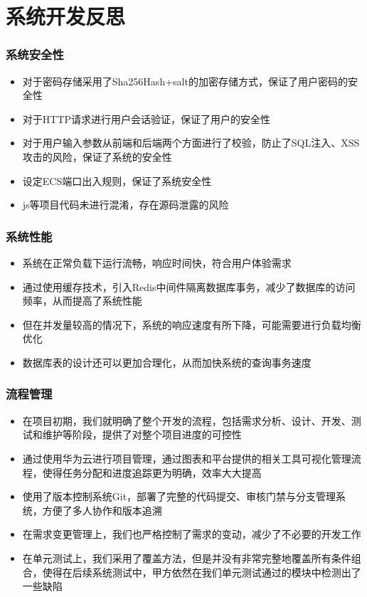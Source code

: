 \section{系统开发反思}
\begin{frame}
    \frametitle{系统安全性}
    \begin{itemize}
        \item 对于密码存储采用了Sha256Hash+salt的加密存储方式，保证了用户密码的安全性
        \item 对于HTTP请求进行用户会话验证，保证了用户的安全性
        \item 对于用户输入参数从前端和后端两个方面进行了校验，防止了SQL注入、XSS攻击的风险，保证了系统的安全性
        \item 设定ECS端口出入规则，保证了系统安全性
        \item js等项目代码未进行混淆，存在源码泄露的风险
    \end{itemize}
\end{frame}

\begin{frame}
    \frametitle{系统性能}
    \begin{itemize}
        \item 系统在正常负载下运行流畅，响应时间快，符合用户体验需求
        \item 通过使用缓存技术，引入Redis中间件隔离数据库事务，减少了数据库的访问频率，从而提高了系统性能
        \item 但在并发量较高的情况下，系统的响应速度有所下降，可能需要进行负载均衡优化
        \item 数据库表的设计还可以更加合理化，从而加快系统的查询事务速度
    \end{itemize}
\end{frame}

\begin{frame}
    \frametitle{流程管理}
    \begin{itemize}
        \item 在项目初期，我们就明确了整个开发的流程，包括需求分析、设计、开发、测试和维护等阶段，提供了对整个项目进度的可控性
        \item 通过使用华为云进行项目管理，通过图表和平台提供的相关工具可视化管理流程，使得任务分配和进度追踪更为明确，效率大大提高
        \item 使用了版本控制系统Git，部署了完整的代码提交、审核门禁与分支管理系统，方便了多人协作和版本追溯
        \item 在需求变更管理上，我们也严格控制了需求的变动，减少了不必要的开发工作
        \item 在单元测试上，我们采用了覆盖方法，但是并没有非常完整地覆盖所有条件组合，使得在后续系统测试中，甲方依然在我们单元测试通过的模块中检测出了一些缺陷
    \end{itemize}
\end{frame}

